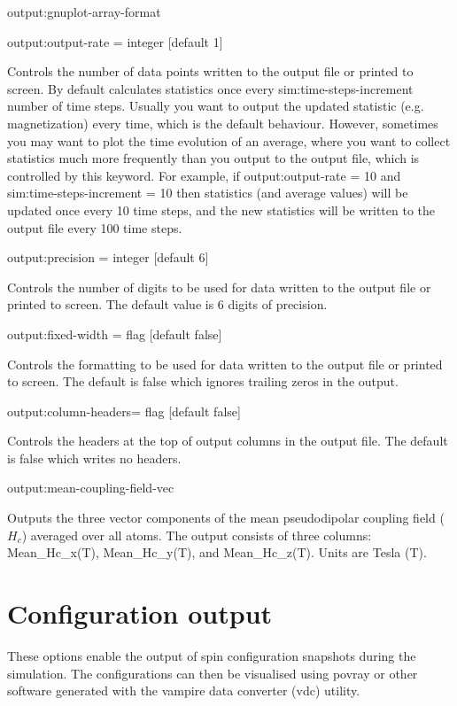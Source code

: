 {\zicf output:gnuplot-array-format}

{\zicf output:output-rate = integer [default 1]} Controls the number of data points written to the output file or printed to screen. By default \vampire calculates statistics once every sim:time-steps-increment number of time steps. Usually you want to output the updated statistic (e.g. magnetization) every time, which is the default behaviour. However, sometimes you may want to plot the time evolution of an average, where you want to collect statistics much more frequently than you output to the output file, which is controlled by this keyword. For example, if output:output-rate = 10 and sim:time-steps-increment = 10 then statistics (and average values) will be updated once every 10 time steps, and the new statistics will be written to the output file every 100 time steps.

{\zicf output:precision = integer [default 6]} Controls the number of digits to be used for data written to the output file or printed to screen. The default value is 6 digits of precision.

{\zicf output:fixed-width = flag [default false]} Controls the formatting to be used for data written to the output file or printed to screen. The default is false which ignores trailing zeros in the output.

{\zicf output:column-headers= flag [default false]} Controls the headers at the top of output columns in the output file. The default is false which writes no headers.

{\zicf output:mean-coupling-field-vec}Outputs the three vector components of the mean pseudodipolar coupling field ($H_c$) averaged over all atoms. The output consists of three columns: Mean\_Hc\_x(T), Mean\_Hc\_y(T), and Mean\_Hc\_z(T). Units are Tesla (T).


\section*{Configuration output}
 These options enable the output of spin configuration snapshots during the simulation. The configurations can then be visualised using povray or other software generated with the vampire data converter (vdc) utility.

